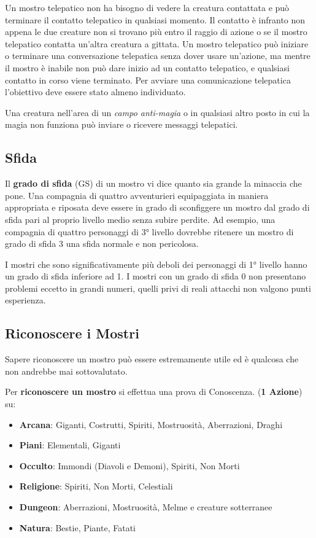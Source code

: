 \begin{multicols}{2}
Un mostro telepatico non ha bisogno di vedere la creatura contattata e può terminare il contatto telepatico in qualsiasi momento. Il contatto è infranto non appena le due creature non si trovano più entro il raggio di azione o se il mostro telepatico contatta un'altra creatura a gittata. Un mostro telepatico può iniziare o terminare una conversazione telepatica senza dover usare un'azione, ma mentre il mostro è inabile non può dare inizio ad un contatto telepatico, e qualsiasi contatto in corso viene terminato. Per avviare una comunicazione telepatica l'obiettivo deve essere stato almeno individuato.

Una creatura nell'area di un \emph{campo anti-magia} o in qualsiasi altro posto in cui la magia non funziona può inviare o ricevere messaggi telepatici.

\subsection{Sfida}

Il \textbf{grado di sfida} (GS) di un mostro vi dice quanto sia grande la minaccia che pone. Una compagnia di quattro avventurieri equipaggiata in maniera appropriata e riposata deve essere in grado di sconfiggere un mostro dal grado di sfida pari al proprio livello medio senza subire perdite. Ad esempio, una compagnia di quattro personaggi di 3° livello dovrebbe ritenere un mostro di grado di sfida 3 una sfida normale e non pericolosa.

I mostri che sono significativamente più deboli dei personaggi di 1° livello hanno un grado di sfida inferiore ad 1. I mostri con un grado di sfida 0 non presentano problemi eccetto in grandi numeri, quelli privi di reali attacchi non valgono punti esperienza.

\subsection{Riconoscere i Mostri}\label{riconoscereimostri}\hypertarget{riconoscereimostri}{} 

Sapere riconoscere un mostro può essere estremamente utile ed è qualcosa che non andrebbe mai sottovalutato.

Per \textbf{riconoscere un mostro} si effettua una prova di Conoscenza. (\textbf{1 Azione}) su:

\medskip

\noindent\begin{itemize}[leftmargin=*] \setlength{\itemsep}{0pt}
\item \textbf{Arcana}: Giganti, Costrutti, Spiriti, Mostruosità, Aberrazioni, Draghi
\item \textbf{Piani}: Elementali, Giganti
\item \textbf{Occulto}: Immondi (Diavoli e Demoni), Spiriti, Non Morti
\item \textbf{Religione}: Spiriti, Non Morti, Celestiali
\item \textbf{Dungeon}: Aberrazioni, Mostruosità, Melme e creature sotterranee
\item \textbf{Natura}: Bestie, Piante, Fatati
\end{itemize}


\end{multicols}
